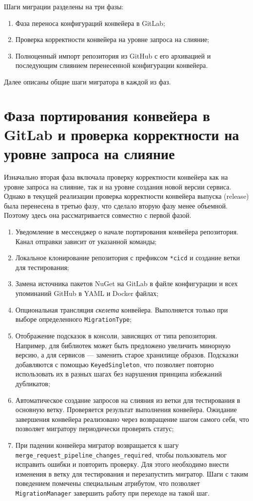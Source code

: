 Шаги миграции разделены на три фазы:
\begin{enumerate}
  \item Фаза переноса конфигураций конвейера в GitLab;
  \item Проверка корректности конвейера на уровне запроса на слияние;
  \item Полноценный импорт репозитория из GitHub с его архивацией и последующим слиянием перенесенной конфигурации конвейера.
\end{enumerate}

Далее описаны общие шаги мигратора в каждой из фаз.

\section{Фаза портирования конвейера в GitLab и проверка корректности на уровне запроса на слияние} \label{sec:first-and-second-phases}
Изначально вторая фаза включала проверку корректности конвейера как на уровне запроса на слияние, так и на уровне создания новой версии сервиса.
Однако в текущей реализации проверка корректности конвейера выпуска (release) была перенесена в третью фазу, что сделало вторую фазу менее объемной.
Поэтому здесь она рассматривается совместно с первой фазой.

\begin{enumerate}
  \item Уведомление в мессенджер о начале портирования конвейера репозитория.
        Канал отправки зависит от указанной команды;
  \item Локальное клонирование репозитория с префиксом \texttt{*cicd} и создание ветки для тестирования;
  \item Замена источника пакетов NuGet\cite{nuget} на GitLab в файле конфигурации и всех упоминаний GitHub в YAML и Docker файлах;
  \item Опциональная трансляция \emph{скелета} конвейера.
        Выполняется только при выборе определенного \texttt{MigrationType};
  \item Отображение подсказок в консоли, зависящих от типа репозитория.
        Например, для библиотек может быть предложено увеличить минорную версию, а для сервисов — заменить старое хранилище образов.
        Подсказки добавляются с помощью \texttt{KeyedSingleton}, что позволяет повторно использовать их в разных шагах без нарушения принципа избежаний дубликатов;
  \item Автоматическое создание запросов на слияния из ветки для тестирования в основную ветку.
        Проверяется результат выполнения конвейера.
        Ожидание завершения конвейера реализовано через возвращение шагом самого себя, что позволяет мигратору периодически проверять статус;
  \item При падении конвейера мигратор возвращается к шагу \texttt{merge\_request\_pipeline\_changes\_required}, чтобы пользователь мог исправить ошибки и повторить проверку.
        Для этого необходимо внести изменения в ветку для тестирования и перезапустить мигратор.
        Шаги с таким поведением помечены специальным атрибутом, что позволяет \texttt{MigrationManager} завершить работу при переходе на такой шаг.
\end{enumerate}


